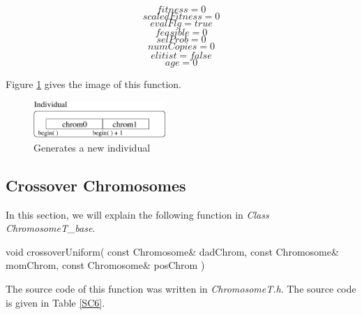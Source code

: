 \documentclass[twocolumn]{article}
\begin{document}
\begin{equation}
fitness = 0
\end{equation}
\begin{equation}
scaledFitness = 0
\end{equation}
\begin{equation}
evalFlg = true
\end{equation}
\begin{equation}
feasible = 0
\end{equation}
\begin{equation}
selProb = 0
\end{equation}
\begin{equation}
numCopies = 0
\end{equation}
\begin{equation}
elitist = false
\end{equation}
\begin{equation}
age = 0
\end{equation}

\noindent
Figure \ref{GenerateInd} gives the image of this function.

\begin{figure}[h]
\begin{center}
\includegraphics[width=5cm]{Individual.eps}
\caption{Generates a new individual}
\label{GenerateInd}
\end{center}
\end{figure}

\subsection{Crossover Chromosomes}

\noindent
In this section, we will explain the following function in {\em Class
ChromosomeT\_base}. 

\begin{center}
void crossoverUniform( const Chromosome\& dadChrom, const Chromosome\&
momChrom, const Chromosome\& posChrom )
\end{center}

\noindent
The source code of this function was written in {\em
ChromosomeT.h}. The source code is given in Table \ref{SC6}.
\end{document}
